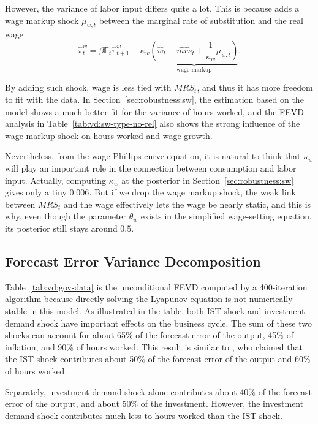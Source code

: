 

However, the variance of labor input differs quite a lot. This is because \cite{smetsShocksFrictionsUS2007} adds a wage markup shock $\mu_{w,t}$ between the marginal rate of substitution and the real wage
$$\hat{\pi}_t^w = \beta \mathbb{E}_t \hat{\pi}_{t+1}^w - \kappa_w \underbrace{\left(\hat{w}_t - \hat{mrs}_t+ \frac{1}{\kappa_w}\mu_{w, t}\right) }_{\text{wage markup}} .$$

By adding such shock, wage is less tied with $MRS_t$, and thus it has more freedom to fit with the data. In Section~\ref{sec:robustness:sw}, the estimation based on the \cite{smetsShocksFrictionsUS2007} model shows a much better fit for the variance of hours worked, and the FEVD analysis in Table~\ref{tab:vd:sw-type-no-rel} also shows the strong influence of the wage markup shock on hours worked and wage growth.

Nevertheless, from the wage Phillips curve equation, it is natural to think that $\kappa_w$ will play an important role in the connection between consumption and labor input. Actually, computing $\kappa_w$ at the posterior in Section~\ref{sec:robustness:sw} gives only a tiny $0.006$. But if we drop the wage markup shock, the weak link between $MRS_t$ and the wage effectively lets the wage be nearly static, and this is why, even though the parameter $\theta_w$ exists in the simplified wage-setting equation, its posterior still stays around $0.5$.

\subsection{Forecast Error Variance Decomposition}
\label{sec:results:fevd}
Table~\ref{tab:vd:gov-data} is the unconditional FEVD computed by a 400-iteration algorithm because directly solving the Lyapunov equation is not numerically stable in this model. As illustrated in the table, both IST shock and investment demand shock have important effects on the business cycle. The sum of these two shocks can account for about 65\% of the forecast error of the output, 45\% of inflation, and 90\% of hours worked. This result is similar to \cite{justinianoInvestmentShocksBusiness2010}, who claimed that the IST shock contributes about 50\% of the forecast error of the output and 60\% of hours worked.

Separately, investment demand shock alone contributes about 40\% of the forecast error of the output, and about 50\% of the investment. However, the investment demand shock contributes much less to hours worked than the IST shock.


